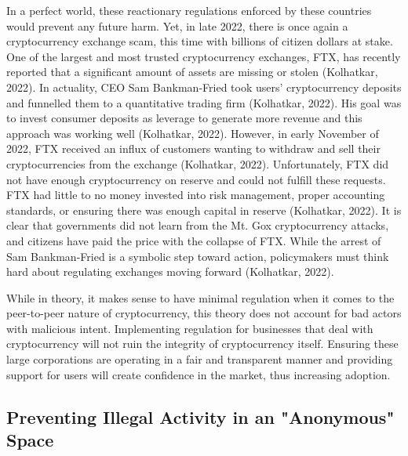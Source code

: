 \documentclass{article}
\begin{document}
\noindent \newline In a perfect world, these reactionary regulations enforced by these countries would prevent any future harm. Yet, in late 2022, there is once again a cryptocurrency exchange scam, this time with billions of citizen dollars at stake. One of the largest and most trusted cryptocurrency exchanges, FTX, has recently reported that a significant amount of assets are missing or stolen (Kolhatkar, 2022). In actuality, CEO Sam Bankman-Fried took users’ cryptocurrency deposits and funnelled them to a quantitative trading firm (Kolhatkar, 2022). His goal was to invest consumer deposits as leverage to generate more revenue and this approach was working well (Kolhatkar, 2022). However, in early November of 2022, FTX received an influx of customers wanting to withdraw and sell their cryptocurrencies from the exchange (Kolhatkar, 2022). Unfortunately, FTX did not have enough cryptocurrency on reserve and could not fulfill these requests. FTX had little to no money invested into risk management, proper accounting standards, or ensuring there was enough capital in reserve (Kolhatkar, 2022). It is clear that governments did not learn from the Mt. Gox cryptocurrency attacks, and citizens have paid the price with the collapse of FTX. While the arrest of Sam Bankman-Fried is a symbolic step toward action, policymakers must think hard about regulating exchanges moving forward (Kolhatkar, 2022).

\noindent \newline While in theory, it makes sense to have minimal regulation when it comes to the peer-to-peer nature of cryptocurrency, this theory does not account for bad actors with malicious intent. Implementing regulation for businesses that deal with cryptocurrency will not ruin the integrity of cryptocurrency itself. Ensuring these large corporations are operating in a fair and transparent manner and providing support for users will create confidence in the market, thus increasing adoption.



\subsection{Preventing Illegal Activity in an "Anonymous" Space}
\end{document}
